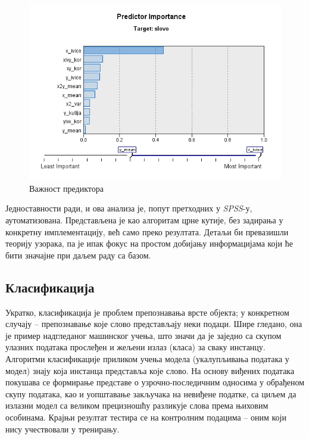 \documentclass[a4paper]{article}
\begin{document}
\begin{figure}[h!]
\begin{center}
\includegraphics[scale=0.7]{../Slike za rad/Glavni prediktori.png}
\end{center}
\caption{Важност предиктора}
\label{pred}
\end{figure}

Једноставности ради, и ова анализа је, попут претходних у \textit{SPSS}-у, аутоматизована. Представљена је као алгоритам црне кутије, без задирања у конкретну имплементацију, већ само преко резултата. Детаљи би превазишли теорију узорака, па је ипак фокус на простом добијању информацијама који ће бити значајне при даљем раду са базом.

\subsection{Класификација}

Укратко, класификација је проблем препознавања врсте објекта; у конкретном случају -- препознавање које слово представљају неки подаци. Шире гледано, она је пример надгледаног машинског учења, што значи да је заједно са скупом улазних података прослеђен и жељени излаз (класа) за сваку инстанцу. Алгоритми класификације приликом учења модела (укалупљивања података у модел) знају која инстанца представља које слово. На основу виђених података покушава се формирање представе о узрочно-последичним односима у обрађеном скупу података, као и уопштавање закључака на невиђене податке, са циљем да излазни модел са великом прецизношћу разликује слова према њиховим особинама. Крајњи резултат тестира се на контролним подацима -- оним који нису учествовали у тренирању.
\end{document}

